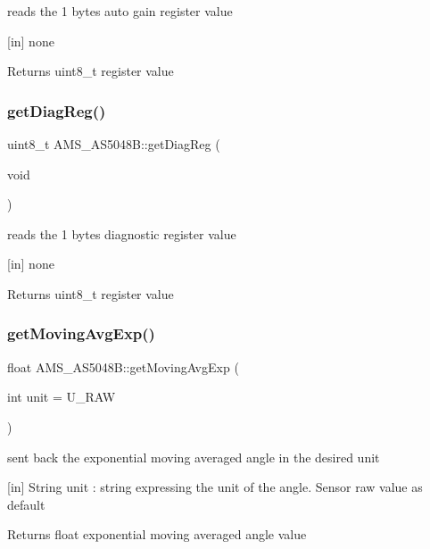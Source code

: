reads the 1 bytes auto gain register value 

\mbox{[}in\mbox{]} none \begin{DoxyReturn}{Returns}
uint8\+\_\+t register value 
\end{DoxyReturn}
\mbox{\label{classAMS__AS5048B_ae2ebf1d3b0e9b9cf73fbf5ea22ada636}} 
\subsubsection{\texorpdfstring{get\+Diag\+Reg()}{getDiagReg()}}
{\footnotesize\ttfamily uint8\+\_\+t A\+M\+S\+\_\+\+A\+S5048\+B\+::get\+Diag\+Reg (\begin{DoxyParamCaption}\item[{void}]{ }\end{DoxyParamCaption})}



reads the 1 bytes diagnostic register value 

\mbox{[}in\mbox{]} none \begin{DoxyReturn}{Returns}
uint8\+\_\+t register value 
\end{DoxyReturn}
\mbox{\label{classAMS__AS5048B_a1d994be5aa856d1e2e033ba4f7ed65fc}} 
\subsubsection{\texorpdfstring{get\+Moving\+Avg\+Exp()}{getMovingAvgExp()}}
{\footnotesize\ttfamily float A\+M\+S\+\_\+\+A\+S5048\+B\+::get\+Moving\+Avg\+Exp (\begin{DoxyParamCaption}\item[{int}]{unit = {\ttfamily U\+\_\+RAW} }\end{DoxyParamCaption})}



sent back the exponential moving averaged angle in the desired unit 

\mbox{[}in\mbox{]} String unit \+: string expressing the unit of the angle. Sensor raw value as default \begin{DoxyReturn}{Returns}
float exponential moving averaged angle value 
\end{DoxyReturn}
\mbox{\label{classAMS__AS5048B_acd55346e4eedada7b86e43f42822ae2a}} 
